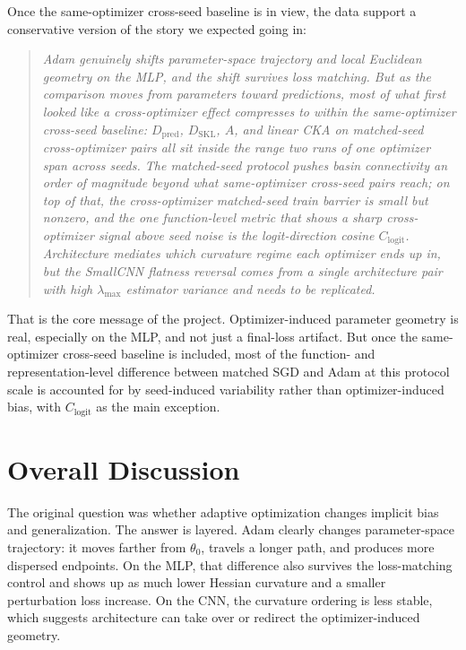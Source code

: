 \documentclass[11pt]{article}
\begin{document}
Once the same-optimizer cross-seed baseline is in view, the data support a conservative version of the story we expected going in:
\begin{quote}
\emph{Adam genuinely shifts parameter-space trajectory and local Euclidean geometry on the MLP, and the shift survives loss matching. But as the comparison moves from parameters toward predictions, most of what first looked like a cross-optimizer effect compresses to within the same-optimizer cross-seed baseline: $D_{\mathrm{pred}}$, $D_{\mathrm{SKL}}$, $A$, and linear CKA on matched-seed cross-optimizer pairs all sit inside the range two runs of one optimizer span across seeds. The matched-seed protocol pushes basin connectivity an order of magnitude beyond what same-optimizer cross-seed pairs reach; on top of that, the cross-optimizer matched-seed train barrier is small but nonzero, and the one function-level metric that shows a sharp cross-optimizer signal above seed noise is the logit-direction cosine $C_{\mathrm{logit}}$. Architecture mediates which curvature regime each optimizer ends up in, but the SmallCNN flatness reversal comes from a single architecture pair with high $\lambda_{\max}$ estimator variance and needs to be replicated.}
\end{quote}

That is the core message of the project. Optimizer-induced parameter geometry is real, especially on the MLP, and not just a final-loss artifact. But once the same-optimizer cross-seed baseline is included, most of the function- and representation-level difference between matched SGD and Adam at this protocol scale is accounted for by seed-induced variability rather than optimizer-induced bias, with $C_{\mathrm{logit}}$ as the main exception.

\FloatBarrier


\section{Overall Discussion}

The original question was whether adaptive optimization changes implicit bias and generalization. The answer is layered. Adam clearly changes parameter-space trajectory: it moves farther from $\theta_0$, travels a longer path, and produces more dispersed endpoints. On the MLP, that difference also survives the loss-matching control and shows up as much lower Hessian curvature and a smaller perturbation loss increase. On the CNN, the curvature ordering is less stable, which suggests architecture can take over or redirect the optimizer-induced geometry.
\end{document}

